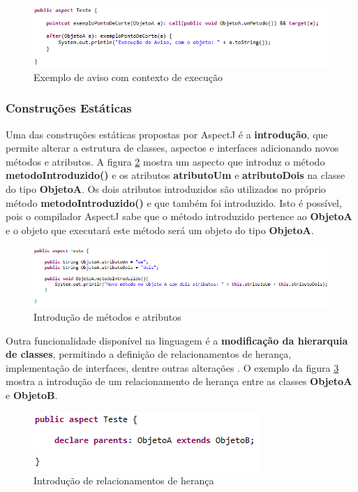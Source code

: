 \begin{figure}[!hb]
	\centering
	\includegraphics{img/advice_code.png}
	\caption{Exemplo de aviso com contexto de execução}\label{fig:advice_code}
\end{figure}

\subsubsection{Construções Estáticas}


Uma das construções estáticas propostas por AspectJ é a \textbf{introdução}, que
permite alterar a estrutura de classes, aspectos e interfaces adicionando novos
métodos e atributos. A figura \ref{fig:introduction} mostra um aspecto que
introduz o método \textbf{metodoIntroduzido()} e os atributos
\textbf{atributoUm} e \textbf{atributoDois} na classe do tipo \textbf{ObjetoA}.
Os dois atributos introduzidos são utilizados no próprio método
\textbf{metodoIntroduzido()} e que também foi introduzido. Isto é possível, pois
o compilador AspectJ sabe que o método introduzido pertence ao \textbf{ObjetoA}
e o objeto que executará este método será um objeto do tipo \textbf{ObjetoA}.

\begin{figure}
	\centering
	\includegraphics[scale=0.9]{img/introduction.png}
	\caption{Introdução de métodos e atributos}\label{fig:introduction}
\end{figure}

Outra funcionalidade disponível na linguagem é a \textbf{modificação da hierarquia de classes}, permitindo a definição de
relacionamentos de herança, implementação de interfaces, dentre outras
alterações \cite{Laddad:2003:AAP:993468}. O exemplo da figura
\ref{fig:introduction_interface} mostra a introdução de um relacionamento de
herança entre as classes \textbf{ObjetoA} e \textbf{ObjetoB}.

\begin{figure}
	\centering
	\includegraphics{img/introduction_interface.png}
	\caption{Introdução de relacionamentos de herança}\label{fig:introduction_interface}
\end{figure}


